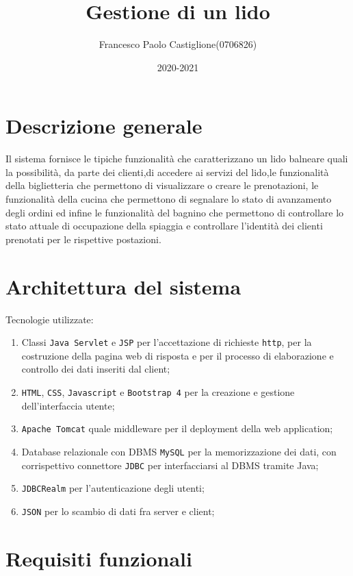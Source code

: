 \documentclass{article}
\title{Gestione di un lido}
\author{Francesco Paolo Castiglione(0706826)}
\date{2020-2021}
\begin{document}
\maketitle
\section{Descrizione generale}
Il sistema fornisce le tipiche funzionalità che caratterizzano un lido balneare quali la possibilità, da parte dei clienti,di accedere ai servizi del lido,le funzionalità della biglietteria che permettono di visualizzare o creare le prenotazioni, le funzionalità della cucina che permettono di segnalare lo stato di avanzamento degli ordini ed infine le funzionalità del bagnino che permettono di controllare lo stato attuale di occupazione della spiaggia e controllare l'identità dei clienti prenotati per le rispettive postazioni. 

\section{Architettura del sistema}

Tecnologie utilizzate:
\begin{enumerate}
	\item Classi \texttt{Java Servlet} e \texttt{JSP} per l'accettazione di richieste \texttt{http}, per la costruzione della pagina web di risposta e per il processo di elaborazione e controllo dei dati inseriti dal client;
	\item \texttt{HTML}, \texttt{CSS},  \texttt{Javascript} e \texttt{Bootstrap 4} per la creazione e gestione dell'interfaccia utente;
	\item \texttt{Apache Tomcat} quale middleware per il deployment della web application;
	\item Database relazionale con DBMS \texttt{MySQL} per la memorizzazione dei dati, con corrispettivo connettore \texttt{JDBC} per interfacciarsi al DBMS tramite Java;
	\item \texttt{JDBCRealm} per l'autenticazione degli utenti;
	\item \texttt{JSON} per lo scambio di dati fra server e client;
\end{enumerate}

\newpage
\section{Requisiti funzionali}
\end{document}
